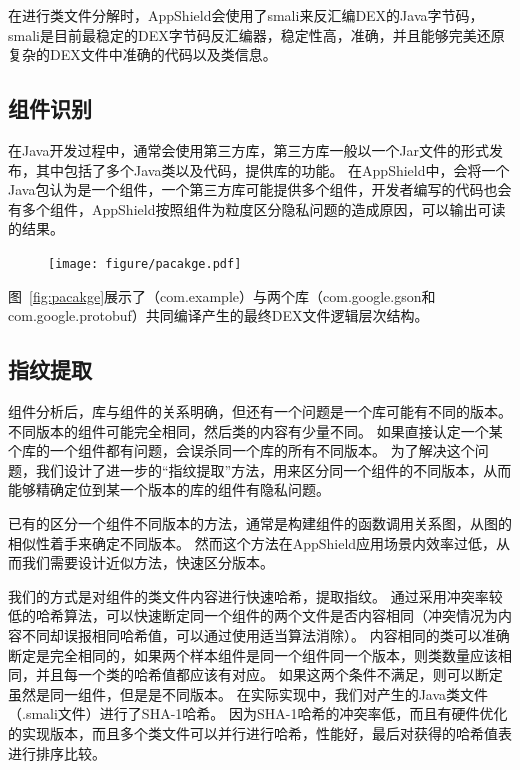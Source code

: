 在进行类文件分解时，AppShield会使用了smali来反汇编DEX的Java字节码，smali是目前最稳定的DEX字节码反汇编器，稳定性高，准确，并且能够完美还原复杂的DEX文件中准确的代码以及类信息。

\subsection{组件识别}

在Java开发过程中，通常会使用第三方库，第三方库一般以一个Jar文件的形式发布，其中包括了多个Java类以及代码，提供库的功能。
在AppShield中，会将一个Java包认为是一个组件，一个第三方库可能提供多个组件，开发者编写的代码也会有多个组件，AppShield按照组件为粒度区分隐私问题的造成原因，可以输出可读的结果。

\begin{figure}
	\centering
	\texttt{[image: figure/pacakge.pdf]}
\end{figure}


图~\ref{fig:pacakge}展示了（com.example）与两个库（com.google.gson和com.google.protobuf）共同编译产生的最终DEX文件逻辑层次结构。

\subsection{指纹提取}

组件分析后，库与组件的关系明确，但还有一个问题是一个库可能有不同的版本。
不同版本的组件可能完全相同，然后类的内容有少量不同。
如果直接认定一个某个库的一个组件都有问题，会误杀同一个库的所有不同版本。
为了解决这个问题，我们设计了进一步的“指纹提取”方法，用来区分同一个组件的不同版本，从而能够精确定位到某一个版本的库的组件有隐私问题。

已有的区分一个组件不同版本的方法，通常是构建组件的函数调用关系图，从图的相似性着手来确定不同版本。
然而这个方法在AppShield应用场景内效率过低，从而我们需要设计近似方法，快速区分版本。

我们的方式是对组件的类文件内容进行快速哈希，提取指纹。
通过采用冲突率较低的哈希算法，可以快速断定同一个组件的两个文件是否内容相同（冲突情况为内容不同却误报相同哈希值，可以通过使用适当算法消除）。
内容相同的类可以准确断定是完全相同的，如果两个样本组件是同一个组件同一个版本，则类数量应该相同，并且每一个类的哈希值都应该有对应。
如果这两个条件不满足，则可以断定虽然是同一组件，但是是不同版本。
在实际实现中，我们对产生的Java类文件（.smali文件）进行了SHA-1哈希。
因为SHA-1哈希的冲突率低，而且有硬件优化的实现版本，而且多个类文件可以并行进行哈希，性能好，最后对获得的哈希值表进行排序比较。

